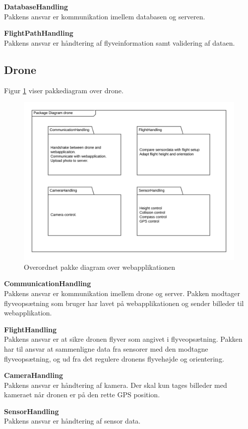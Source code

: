 \textbf{DatabaseHandling}\\
Pakkens ansvar er kommunikation imellem databasen og serveren. 

\textbf{FlightPathHandling}\\
Pakkens ansvar er håndtering af flyveinformation samt validering af dataen.




\newpage
\subsection{Drone}

Figur \ref{fig:pakke_diagram_drone} viser pakkediagram over drone. 

\vspace{-5pt}
\begin{figure}[H]
	\centering
	\includegraphics[width=1\textwidth]{Billeder/pakke_diagrammer/package_diagram_drone.png}
	\vspace{-1cm}
	\caption{Overordnet pakke diagram over webapplikationen}
	\label{fig:pakke_diagram_drone}
\end{figure}

\textbf{CommunicationHandling}\\
Pakkens ansvar er kommunikation imellem drone og server. Pakken modtager flyveopsætning som bruger har lavet på webapplikationen og sender billeder til webapplikation.

\textbf{FlightHandling}\\
Pakkens ansvar er at sikre dronen flyver som angivet i flyveopsætning. Pakken har til ansvar at sammenligne data fra sensorer med den modtagne flyveopsætning, og ud fra det regulere dronens flyvehøjde og orientering. 

\textbf{CameraHandling}\\
Pakkens ansvar er håndtering af kamera. Der skal kun tages billeder med kameraet når dronen er på den rette GPS position. 

\textbf{SensorHandling}\\
Pakkens ansvar er håndtering af sensor data.
